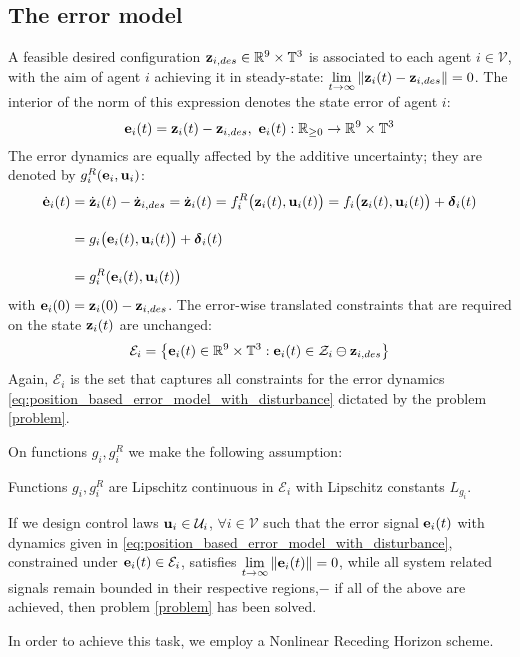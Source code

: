 \subsection{The error model}

A feasible desired configuration
$\bm{\mathbf{z}}_{i,des} \in \mathbb{R}^9 \times \mathbb{T}^3$
is associated to each agent $i \in \mathcal{V}$, with the aim of agent $i$
achieving it in steady-state:
$\lim\limits_{t \to \infty} \|\bm{\mathbf{z}}_i(t) - \bm{\mathbf{z}}_{i,des}\| = 0$. The
interior of the norm of this expression denotes the state error of agent $i$:
$$\bm{\mathbf{e}}_i(t) = \bm{\mathbf{z}}_i(t) - \bm{\mathbf{z}}_{i,des},\ \bm{\mathbf{e}}_i(t) :
\mathbb{R}_{\geq 0} \to \mathbb{R}^9 \times \mathbb{T}^3$$
The error dynamics are equally affected by the additive uncertainty;
they are denoted by $g_i^R(\bm{\mathbf{e}}_i, \bm{\mathbf{u}}_i)$:
\begin{align}
  \dot{\bm{\mathbf{e}}}_i(t) &= \dot{\bm{\mathbf{z}}}_i(t) - \dot{\bm{\mathbf{z}}}_{i,des} =
  \dot{\bm{\mathbf{z}}}_i(t) = f_i^R\big(\bm{\mathbf{z}}_i(t), \bm{\mathbf{u}}_i(t)\big) =  f_i \big(\bm{\mathbf{z}}_i (t), \bm{\mathbf{u}}_i (t)\big) + \bm{\mathbf{\delta}}_i(t) \\[2.5ex]
  &=g_i \big(\bm{\mathbf{e}}_i (t), \bm{\mathbf{u}}_i (t)\big) + \bm{\mathbf{\delta}}_i(t) \\[2.5ex]
                      &= g_i^R(\bm{\mathbf{e}}_i(t), \bm{\mathbf{u}}_i(t)\big)
    \label{eq:position_based_error_model_with_disturbance}
\end{align}
with $\bm{\mathbf{e}}_i(0) = \bm{\mathbf{z}}_i(0) - \bm{\mathbf{z}}_{i,des}$.
The error-wise translated constraints that are required on the state
$\bm{\mathbf{z}}_i(t)$ are unchanged:
$$\mathcal{E}_i = \big\{\bm{\mathbf{e}}_i(t) \in \mathbb{R}^9 \times \mathbb{T}^3 :
\bm{\mathbf{e}}_i(t) \in \mathcal{Z}_i \ominus \bm{\mathbf{z}}_{i,des} \big\}$$
Again, $\mathcal{E}_i $ is the set that captures all constraints for the error
dynamics \eqref{eq:position_based_error_model_with_disturbance} dictated
by the problem \eqref{problem}.

On functions $g_i, g^R_i$ we make the following assumption:
\begin{bw_box}
  \begin{assumption}

    Functions $g_i, g^R_i$ are Lipschitz continuous in $\mathcal{E}_i$
    with Lipschitz constants $L_{g_i}$.

\end{assumption}
\end{bw_box}

If we design control laws $\bm{\mathbf{u}}_i \in \mathcal{U}_i$,
$\forall i \in \mathcal{V}$ such that the error signal $\bm{\mathbf{e}}_i(t)$ with
dynamics given in \eqref{eq:position_based_error_model_with_disturbance}, constrained under
$\bm{\mathbf{e}}_i(t) \in \mathcal{E}_i$, satisfies
$\lim\limits_{t \to \infty} \|\bm{\mathbf{e}}_i(t)\| = 0$, while all system related
signals remain bounded in their respective regions,$-$ if all of the above are
achieved, then problem \eqref{problem} has been solved.

In order to achieve this task, we employ a Nonlinear Receding Horizon scheme.
